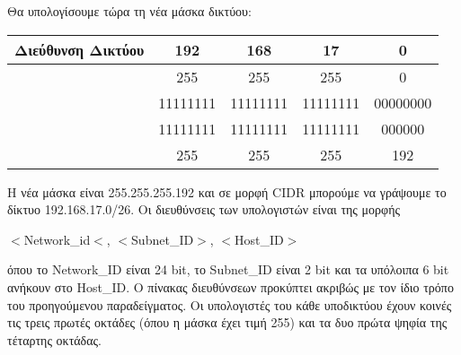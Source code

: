 Θα υπολογίσουμε τώρα τη νέα μάσκα δικτύου:

\begin{center}
\fontsize{11}{13}
\ttfamily
\begin{tabular}{|c|c|c|c|c|}
\hline
 \textbf{Διεύθυνση Δικτύου} & 192 & 168 & 17 & 0 \\ 
\hline
\multirow{2}{*}{} \textbf{Παλιά Μάσκα} & 255 & 255 & 255  & 0 \\ 
\cline{2-5} 
              \textbf{Δικτύου} & 11111111  & 11111111 & 11111111 & 00000000 \\ 
\hline
\multirow{2}{*}{} \textbf{Νέα Μάσκα} & 11111111 & 11111111 & 11111111 & \colorbox{red}{\color{white}{11}}000000  \\ 
\cline{2-5} 
             \textbf{Υποδικτύου} & 255 & 255 & 255 & 192 \\ 
\hline
\end{tabular}
\normalfont
\end{center}

Η νέα μάσκα είναι 255.255.255.192 και σε μορφή CIDR μπορούμε να γράψουμε το δίκτυο 192.168.17.0/26. Οι διευθύνσεις των υπολογιστών είναι της μορφής 

$<$Network\_id$<$, $<$Subnet\_ID$>$, $<$Host\_ID$>$

όπου το Network\_ID είναι 24 bit, το Subnet\_ID είναι 2 bit και τα υπόλοιπα 6 bit ανήκουν στο Host\_ID. Ο πίνακας διευθύνσεων προκύπτει ακριβώς με τον ίδιο τρόπο του προηγούμενου παραδείγματος. Οι υπολογιστές του κάθε υποδικτύου έχουν κοινές τις τρεις πρωτές οκτάδες (όπου η μάσκα έχει τιμή 255) και τα δυο πρώτα ψηφία της τέταρτης οκτάδας.

